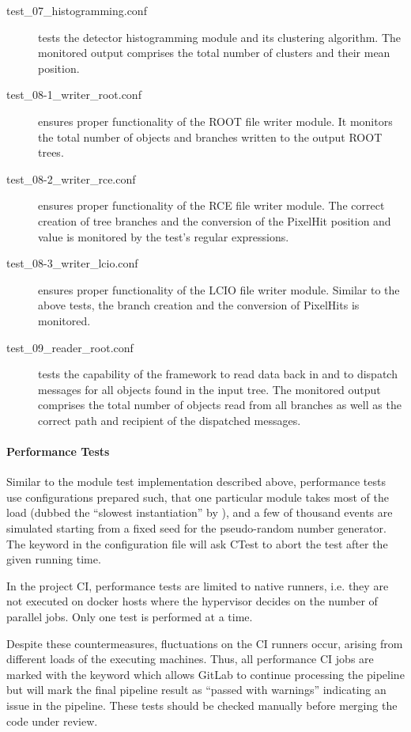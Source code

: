 \begin{description}
    \item[test\_07\_histogramming.conf] tests the detector histogramming module and its clustering algorithm. The monitored output comprises the total number of clusters and their mean position.
    \item[test\_08-1\_writer\_root.conf] ensures proper functionality of the ROOT file writer module. It monitors the total number of objects and branches written to the output ROOT trees.
    \item[test\_08-2\_writer\_rce.conf] ensures proper functionality of the RCE file writer module. The correct creation of tree branches and the conversion of the PixelHit position and value is monitored by the test's regular expressions.
    \item[test\_08-3\_writer\_lcio.conf] ensures proper functionality of the LCIO file writer module. Similar to the above tests, the branch creation and the conversion of PixelHits is monitored.
    \item[test\_09\_reader\_root.conf] tests the capability of the framework to read data back in and to dispatch messages for all objects found in the input tree. The monitored output comprises the total number of objects read from all branches as well as the correct path and recipient of the dispatched messages.
\end{description}

\paragraph{Performance Tests}

Similar to the module test implementation described above, performance tests use configurations prepared such, that one particular module takes most of the load (dubbed the ``slowest instantiation'' by \apsq), and a few of thousand events are simulated starting from a fixed seed for the pseudo-random number generator.
The  keyword in the configuration file will ask CTest to abort the test after the given running time.

In the project CI, performance tests are limited to native runners, i.e. they are not executed on docker hosts where the hypervisor decides on the number of parallel jobs.
Only one test is performed at a time.

Despite these countermeasures, fluctuations on the CI runners occur, arising from different loads of the executing machines.
Thus, all performance CI jobs are marked with the  keyword which allows GitLab to continue processing the pipeline but will mark the final pipeline result as ``passed with warnings'' indicating an issue in the pipeline.
These tests should be checked manually before merging the code under review.

